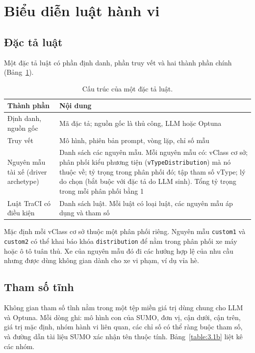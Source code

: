 \documentclass[../DoAn.tex]{subfiles}
\begin{document}
\section{Biểu diễn luật hành vi}
\label{section:3.3}

\subsection{Đặc tả luật}

Một đặc tả luật có phần định danh, phần truy vết và hai thành phần chính (Bảng~\ref{table:3.1a}).

\begin{table}[ht]
\centering
\small
\caption{Cấu trúc của một đặc tả luật.}
\label{table:3.1a}
\begin{tabular}{|p{3.4cm}|p{10.6cm}|}
\hline
\textbf{Thành phần} & \textbf{Nội dung} \\
\hline
Định danh, nguồn gốc & Mã đặc tả; nguồn gốc là thủ công, LLM hoặc Optuna \\
\hline
Truy vết & Mô hình, phiên bản prompt, vòng lặp, chỉ số mẫu \\
\hline
Nguyên mẫu tài xế (driver archetype) & Danh sách các nguyên mẫu. Mỗi nguyên mẫu có: vClass cơ sở; phân phối kiểu phương tiện (\texttt{vTypeDistribution}) mà nó thuộc về; tỷ trọng trong phân phối đó; tập tham số vType; lý do chọn (bắt buộc với đặc tả do LLM sinh). Tổng tỷ trọng trong mỗi phân phối bằng 1 \\
\hline
Luật TraCI có điều kiện & Danh sách luật. Mỗi luật có loại luật, các nguyên mẫu áp dụng và tham số \\
\hline
\end{tabular}
\end{table}

Mặc định mỗi vClass cơ sở thuộc một phân phối riêng. Nguyên mẫu \texttt{custom1} và \texttt{custom2} có thể khai báo khóa \texttt{distribution} để nằm trong phân phối xe máy hoặc ô tô tuân thủ. Xe của nguyên mẫu đó đi các hướng hợp lệ của nhu cầu nhưng được dùng không gian dành cho xe vi phạm, ví dụ vỉa hè.

\subsection{Tham số tĩnh}

Không gian tham số tĩnh nằm trong một tệp miền giá trị dùng chung cho LLM và Optuna. Mỗi dòng ghi: mô hình con của SUMO, đơn vị, cận dưới, cận trên, giá trị mặc định, nhóm hành vi liên quan, các chỉ số có thể ràng buộc tham số, và đường dẫn tài liệu SUMO xác nhận tên thuộc tính. Bảng~\ref{table:3.1b} liệt kê các nhóm.
\end{document}
